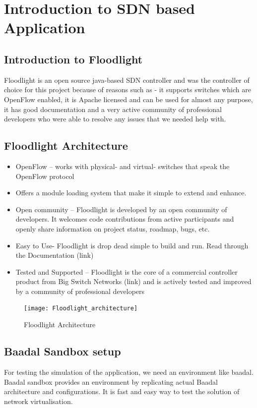 \chapter{Introduction to SDN based Application}

\section{Introduction to Floodlight}
Floodlight is an open source java-based SDN controller and was the controller of choice for this project because of reasons such as - it supports switches which are OpenFlow enabled, it is Apache licensed and can be used for almost any purpose, it has good documentation and a very active community of professional developers who were able to resolve any issues that we needed help with.


\section{Floodlight Architecture}
\begin{itemize}
\item OpenFlow – works with physical- and virtual- switches that speak the OpenFlow protocol
\item Offers a module loading system that make it simple to extend and enhance. 

\item Open community – Floodlight is developed by an open community of developers. It welcomes code contributions from active participants and openly share information on project status, roadmap, bugs, etc.

\item Easy to Use- Floodlight is drop dead simple to build and run. Read through the Documentation (link)

\item Tested and Supported – Floodlight is the core of a commercial controller product from Big Switch Networks (link) and is actively tested and improved by a community of professional developers


\end{itemize}
    
\begin{figure}[h]
\caption{Floodlight Architecture}
\centering
\texttt{[image: Floodlight\_architecture]}
\end{figure}

\section{Baadal Sandbox setup}
For testing the simulation of the application, we need an environment like baadal. Baadal sandbox provides an environment by replicating actual Baadal architecture and configurations. It is fast and easy way to test the solution of network virtualisation. 



